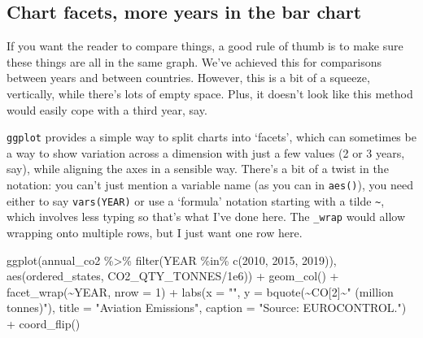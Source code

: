 \documentclass[
]{book}
\newenvironment{Shaded}{\begin{snugshade}}{\end{snugshade}}
\newcommand{\AttributeTok}[1]{\textcolor[rgb]{0.77,0.63,0.00}{#1}}
\newcommand{\DecValTok}[1]{\textcolor[rgb]{0.00,0.00,0.81}{#1}}
\newcommand{\FloatTok}[1]{\textcolor[rgb]{0.00,0.00,0.81}{#1}}
\newcommand{\FunctionTok}[1]{\textcolor[rgb]{0.00,0.00,0.00}{#1}}
\newcommand{\NormalTok}[1]{#1}
\newcommand{\SpecialCharTok}[1]{\textcolor[rgb]{0.00,0.00,0.00}{#1}}
\newcommand{\StringTok}[1]{\textcolor[rgb]{0.31,0.60,0.02}{#1}}
\begin{document}
\hypertarget{chart-facets-more-years-in-the-bar-chart}{%
\subsection{Chart facets, more years in the bar chart}\label{chart-facets-more-years-in-the-bar-chart}}

If you want the reader to compare things, a good rule of thumb is to make sure these things are all in the same graph. We've achieved this for comparisons between years and between countries. However, this is a bit of a squeeze, vertically, while there's lots of empty space. Plus, it doesn't look like this method would easily cope with a third year, say.

\texttt{ggplot} provides a simple way to split charts into `facets', which can sometimes be a way to show variation across a dimension with just a few values (2 or 3 years, say), while aligning the axes in a sensible way. There's a bit of a twist in the notation: you can't just mention a variable name (as you can in \texttt{aes()}), you need either to say \texttt{vars(YEAR)} or use a `formula' notation starting with a tilde \texttt{\textasciitilde{}}, which involves less typing so that's what I've done here. The \texttt{\_wrap} would allow wrapping onto multiple rows, but I just want one row here.

\begin{Shaded}
\begin{Highlighting}[]
\FunctionTok{ggplot}\NormalTok{(annual\_co2 }\SpecialCharTok{\%\textgreater{}\%} 
         \FunctionTok{filter}\NormalTok{(YEAR }\SpecialCharTok{\%in\%} \FunctionTok{c}\NormalTok{(}\DecValTok{2010}\NormalTok{, }\DecValTok{2015}\NormalTok{, }\DecValTok{2019}\NormalTok{)), }
       \FunctionTok{aes}\NormalTok{(ordered\_states,}
\NormalTok{           CO2\_QTY\_TONNES}\SpecialCharTok{/}\FloatTok{1e6}\NormalTok{)) }\SpecialCharTok{+}  
  \FunctionTok{geom\_col}\NormalTok{() }\SpecialCharTok{+}
  \FunctionTok{facet\_wrap}\NormalTok{(}\SpecialCharTok{\textasciitilde{}}\NormalTok{YEAR, }\AttributeTok{nrow =} \DecValTok{1}\NormalTok{) }\SpecialCharTok{+} 
  \FunctionTok{labs}\NormalTok{(}\AttributeTok{x =} \StringTok{""}\NormalTok{, }
       \AttributeTok{y =} \FunctionTok{bquote}\NormalTok{(}\SpecialCharTok{\textasciitilde{}}\NormalTok{CO[}\DecValTok{2}\NormalTok{]}\SpecialCharTok{\textasciitilde{}}\StringTok{" (million tonnes)"}\NormalTok{),}
       \AttributeTok{title =} \StringTok{"Aviation Emissions"}\NormalTok{,}
       \AttributeTok{caption =} \StringTok{"Source: EUROCONTROL."}\NormalTok{) }\SpecialCharTok{+} 
  \FunctionTok{coord\_flip}\NormalTok{()}
\end{Highlighting}
\end{Shaded}
\end{document}
